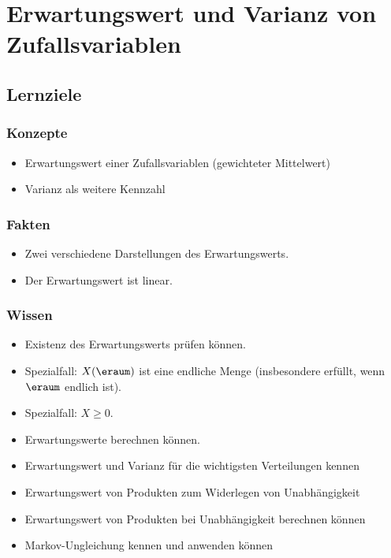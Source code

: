 


\chapter{Erwartungswert und Varianz von Zufallsvariablen}\label{ch:erwartungswert-und-varianz-von-zufallsvariablen}


\section*{Lernziele}

\subsection*{Konzepte}
\begin{itemize}
    \item Erwartungswert einer Zufallsvariablen (gewichteter Mittelwert)
    \item Varianz als weitere Kennzahl
\end{itemize}

\subsection*{Fakten}
\begin{itemize}
    \item Zwei verschiedene Darstellungen des Erwartungswerts.
    \item Der Erwartungswert ist linear.
\end{itemize}

\subsection*{Wissen}
\begin{itemize}
    \item Existenz des Erwartungswerts prüfen können.
    \item Spezialfall: \(X(\eraum)\) ist eine endliche Menge (insbesondere erfüllt, wenn \(\eraum\) endlich ist).
    \item Spezialfall: \(X \geq 0\).
    \item Erwartungswerte berechnen können.
    \item Erwartungswert und Varianz für die wichtigsten Verteilungen kennen
    \item Erwartungswert von Produkten zum Widerlegen von Unabhängigkeit
    \item Erwartungswert von Produkten bei Unabhängigkeit berechnen können
    \item Markov-Ungleichung kennen und anwenden können
\end{itemize}



